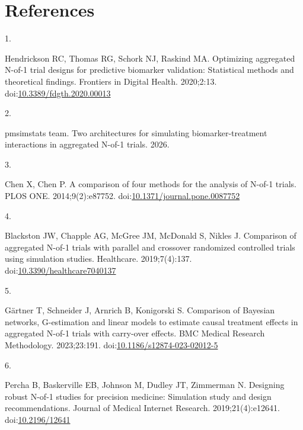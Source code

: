 \documentclass[
  11pt,
]{article}
\newlength{\cslhangindent}
\newlength{\csllabelwidth}
\newenvironment{CSLReferences}[2] %
 {\begin{list}{}{%
  \setlength{\itemindent}{0pt}
  \setlength{\leftmargin}{0pt}
  \setlength{\parsep}{0pt}
  \ifodd #1
   \setlength{\leftmargin}{\cslhangindent}
   \setlength{\itemindent}{-1\cslhangindent}
  \fi
  \setlength{\itemsep}{#2\baselineskip}}}
 {\end{list}}
\newcommand{\CSLLeftMargin}[1]{\parbox[t]{\csllabelwidth}{\strut#1\strut}}
\newcommand{\CSLRightInline}[1]{\parbox[t]{\linewidth - \csllabelwidth}{\strut#1\strut}}
\begin{document}
\section{References}\label{references}

\protect{}\label{refs}
\begin{CSLReferences}{0}{1}
\CSLLeftMargin{1. }%
\CSLRightInline{Hendrickson RC, Thomas RG, Schork NJ, Raskind MA. Optimizing aggregated {N}-of-1 trial designs for predictive biomarker validation: Statistical methods and theoretical findings. Frontiers in Digital Health. 2020;2:13. doi:\href{https://doi.org/10.3389/fdgth.2020.00013}{10.3389/fdgth.2020.00013}}

\CSLLeftMargin{2. }%
\CSLRightInline{{pmsimstats team}. Two architectures for simulating biomarker-treatment interactions in aggregated {N}-of-1 trials. 2026.}

\CSLLeftMargin{3. }%
\CSLRightInline{Chen X, Chen P. A comparison of four methods for the analysis of {N}-of-1 trials. PLOS ONE. 2014;9(2):e87752. doi:\href{https://doi.org/10.1371/journal.pone.0087752}{10.1371/journal.pone.0087752}}

\CSLLeftMargin{4. }%
\CSLRightInline{Blackston JW, Chapple AG, McGree JM, McDonald S, Nikles J. Comparison of aggregated {N}-of-1 trials with parallel and crossover randomized controlled trials using simulation studies. Healthcare. 2019;7(4):137. doi:\href{https://doi.org/10.3390/healthcare7040137}{10.3390/healthcare7040137}}

\CSLLeftMargin{5. }%
\CSLRightInline{Gärtner T, Schneider J, Arnrich B, Konigorski S. Comparison of {B}ayesian networks, {G}-estimation and linear models to estimate causal treatment effects in aggregated {N}-of-1 trials with carry-over effects. BMC Medical Research Methodology. 2023;23:191. doi:\href{https://doi.org/10.1186/s12874-023-02012-5}{10.1186/s12874-023-02012-5}}

\CSLLeftMargin{6. }%
\CSLRightInline{Percha B, Baskerville EB, Johnson M, Dudley JT, Zimmerman N. Designing robust {N}-of-1 studies for precision medicine: Simulation study and design recommendations. Journal of Medical Internet Research. 2019;21(4):e12641. doi:\href{https://doi.org/10.2196/12641}{10.2196/12641}}


\end{CSLReferences}
\end{document}
